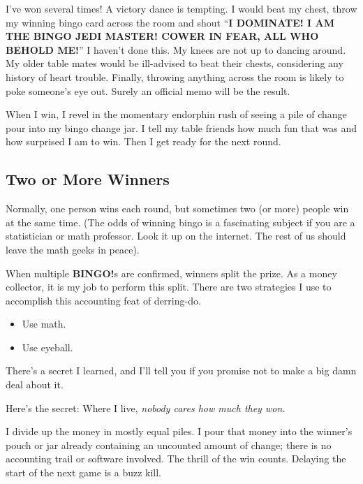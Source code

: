 \documentclass[
  letterpaper,
  DIV=11,
  numbers=noendperiod]{scrreprt}
\begin{document}

I've won several times! A victory dance is tempting. I would beat my
chest, throw my winning bingo card across the room and shout ``\textbf{I
DOMINATE! I AM THE BINGO JEDI MASTER! COWER IN FEAR, ALL WHO BEHOLD
ME!}'' I haven't done this. My knees are not up to dancing around. My
older table mates would be ill-advised to beat their chests, considering
any history of heart trouble. Finally, throwing anything across the room
is likely to poke someone's eye out. Surely an official memo will be the
result.

When I win, I revel in the momentary endorphin rush of seeing a pile of
change pour into my bingo change jar. I tell my table friends how much
fun that was and how surprised I am to win. Then I get ready for the
next round.

\subsection*{Two or More Winners}\label{two-or-more-winners}

Normally, one person wins each round, but sometimes two (or more) people
win at the same time. (The odds of winning bingo is a fascinating
subject if you are a statistician or math professor. Look it up on the
internet. The rest of us should leave the math geeks in peace).

When multiple \textbf{BINGO!}s are confirmed, winners split the prize.
As a money collector, it is my job to perform this split. There are two
strategies I use to accomplish this accounting feat of derring-do.

\begin{itemize}
\item
  Use math.
\item
  Use eyeball.
\end{itemize}

There's a secret I learned, and I'll tell you if you promise not to make
a big damn deal about it.

Here's the secret: Where I live, \emph{nobody cares how much they won.}

I divide up the money in mostly equal piles. I pour that money into the
winner's pouch or jar already containing an uncounted amount of change;
there is no accounting trail or software involved. The thrill of the win
counts. Delaying the start of the next game is a buzz kill.
\end{document}
